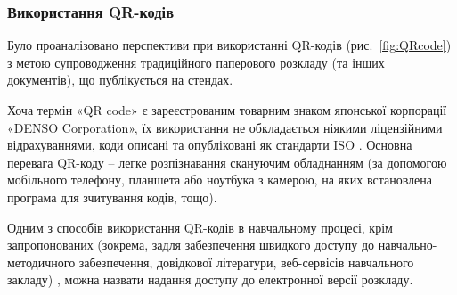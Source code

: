 \subsubsection{Використання QR-кодів}

Було проаналізовано перспективи при використанні QR-кодів (рис.~\ref{fig:QRcode}) з метою супроводження традиційного паперового розкладу (та інших документів), що публікується на стендах.

Хоча термін «QR code» є зареєстрованим товарним знаком японської корпорації «DENSO Corporation», їх використання не обкладається ніякими ліцензійними відрахуваннями, коди описані та опубліковані як стандарти ISO \cite{воронкін2014можливості}. Основна перевага QR-коду – легке розпізнавання скануючим обладнанням (за допомогою мобільного телефону, планшета або ноутбука з камерою, на яких встановлена програма для зчитування кодів, тощо).

Одним з способів використання QR-кодів в навчальному процесі, крім запропонованих (зокрема, задля забезпечення швидкого доступу до навчально-методичного забезпечення, довідкової літератури, веб-сервісів навчального закладу) \cite[146]{воронкін2014можливості},  можна назвати надання доступу до електронної версії розкладу.
